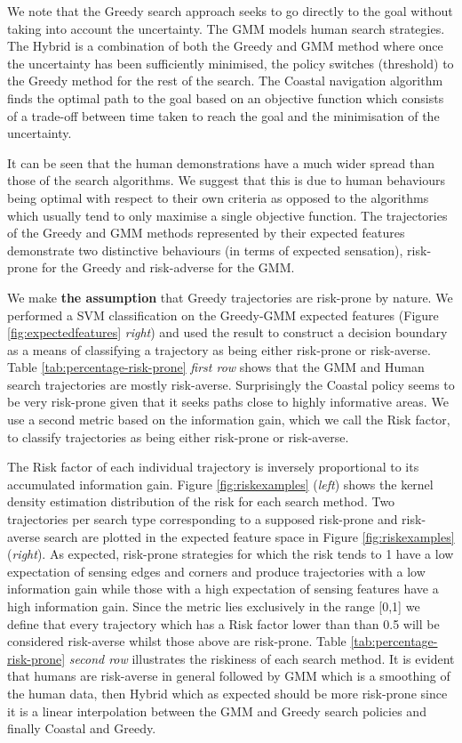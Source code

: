 We note that the Greedy search approach seeks to go directly to the goal without taking into account 
the uncertainty. The GMM models human search strategies. The Hybrid is a combination of both the Greedy and GMM method 
where once the uncertainty has been sufficiently minimised, the policy switches (threshold) to the Greedy method for the rest of 
the search. The Coastal navigation algorithm finds the optimal path to the goal based on an objective function which
consists of a trade-off between time taken to reach the goal and the minimisation of the uncertainty.

It can be seen that the human demonstrations have a much wider spread than those of the search algorithms. 
We suggest that this is due to human behaviours being optimal with respect to their own criteria as opposed to the algorithms 
which usually tend to only maximise a single objective function. The trajectories of the Greedy and GMM methods represented by their 
expected features demonstrate two distinctive behaviours (in terms of expected sensation), risk-prone for the Greedy and risk-adverse
for the GMM.

We make \textbf{the assumption} that Greedy trajectories are risk-prone by nature. We performed a SVM classification on the 
Greedy-GMM expected features (Figure \ref{fig:expectedfeatures} \textit{right}) and used the result to construct a decision boundary as a means
of classifying a trajectory as being either risk-prone or risk-averse. Table \ref{tab:percentage-risk-prone} \textit{first row} shows that
the GMM and Human search trajectories are mostly risk-averse. Surprisingly the Coastal policy seems to be very risk-prone given 
that it seeks paths close to highly informative areas.
We use a second metric based on the information gain, which we call the Risk factor, to classify trajectories as being either 
risk-prone or risk-averse.

The Risk factor of each individual trajectory is inversely proportional to its accumulated information gain. Figure \ref{fig:riskexamples} (\textit{left}) shows the kernel density estimation distribution of the risk 
for each search method. Two trajectories per search type corresponding to a supposed risk-prone and risk-averse search
are plotted in the expected feature space in Figure \ref{fig:riskexamples} (\textit{right}). As expected, risk-prone strategies 
for which the risk tends to 1 have a low expectation of sensing edges and corners and produce trajectories with a 
low information gain while those with a high expectation of sensing features have a high information gain. 
Since the metric lies exclusively in the range [0,1] we define that every trajectory which has a Risk factor lower than than 0.5 will 
be considered risk-averse whilst those above are risk-prone. Table \ref{tab:percentage-risk-prone} \textit{second row} illustrates
the riskiness of each search method. It is evident that humans are risk-averse in general followed by GMM which is a smoothing 
of the human data, then Hybrid which as expected should be more risk-prone since it is a linear interpolation between the GMM and 
Greedy search policies and finally Coastal and Greedy.

